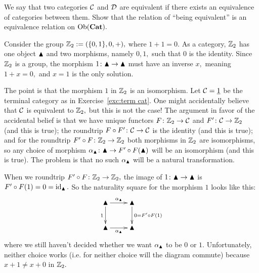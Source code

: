 \documentclass[../main/CT4S-EN-RU]{subfiles}
\begin{document}
\begin{exerciseRUS}
\end{exerciseRUS}

\begin{exerciseENG}
We say that two categories $\mathcal{C}$ and $\mathcal{D}$ are equivalent if there exists an equivalence of categories between them. Show that the relation of “being equivalent” is an equivalence relation on $\operatorname{Ob}({\mathbf{Cat}}).$
\end{exerciseENG}

\begin{exerciseRUS}
\end{exerciseRUS}

\begin{exampleENG}\label{ex:Z1 not equiv Z2}
Consider the group ${\mathbb Z}_2:=(\{0,1\},0,+),$ where $1+1=0.$ As a category, ${\mathbb Z}_2$ has one object $\blacktriangle$ and two morphisms, namely $0,1,$ such that $0$ is the identity. Since ${\mathbb Z}_2$ is a group, the morphism $1\colon\blacktriangle\rightarrow\blacktriangle$ must have an inverse $x,$ meaning $1+x=0,$ and $x=1$ is the only solution.

The point is that the morphism $1$ in ${\mathbb Z}_2$ is an isomorphism. Let $\mathcal{C}=\underline{1}$ be the terminal category as in Exercise~\ref{exc:term cat}. One might accidentally believe that $\mathcal{C}$ is equivalent to ${\mathbb Z}_2,$ but this is not the case! The argument in favor of the accidental belief is that we have unique functors $F\colon{\mathbb Z}_2\rightarrow\mathcal{C}$ and $F'\colon\mathcal{C}\rightarrow{\mathbb Z}_2$ (and this is true); the roundtrip $F\circ F'\colon\mathcal{C}\rightarrow\mathcal{C}$ is the identity (and this is true); and for the roundtrip $F'\circ F\colon{\mathbb Z}_2\rightarrow{\mathbb Z}_2$ both morphisms in ${\mathbb Z}_2$ are isomorphisms, so any choice of morphism $\alpha_\blacktriangle\colon\blacktriangle\rightarrow F'\circ F(\blacktriangle)$ will be an isomorphism (and this is true). The problem is that no such $\alpha_\blacktriangle$ will be a natural transformation.

When we roundtrip $F'\circ F\colon{\mathbb Z}_2\rightarrow{\mathbb Z}_2,$ the image of $1\colon\blacktriangle\rightarrow\blacktriangle$ is $F'\circ F(1)=0=\operatorname{id}_{\blacktriangle}.$ So the naturality square for the morphism $1$ looks like this:
$$
\xymatrix{\monOb\ar[r]^{\alpha_\monOb}\ar[d]_{1}&\monOb\ar[d]^{0=F'\circ F(1)}\\\monOb\ar[r]_{\alpha_\monOb}&\monOb}
$$
where we still haven't decided whether we want $\alpha_\blacktriangle$ to be $0$ or $1.$ Unfortunately, neither choice works (i.e. for neither choice will the diagram commute) because $x+1\neq x+0$ in ${\mathbb Z}_2.$
\end{exampleENG}

\begin{exampleRUS}\label{ex:Z1 not equiv Z2}
\end{exampleRUS}
\end{document}
